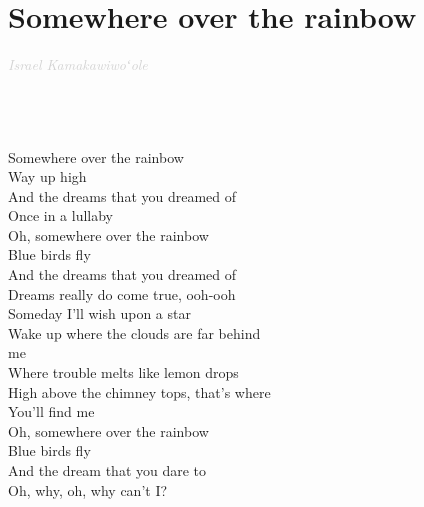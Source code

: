 \documentclass[a5paper, 10pt]{book}
\begin{document}
\newpage
\section{Somewhere over the rainbow}\textcolor{lightgray}{\textit{Israel Kamakawiwoʻole}}\\~\\
\begin{minipage}[t]{0.7\textwidth}
~\\~\\
Somewhere over the rainbow\\
Way up high\\
And the dreams that you dreamed of\\
Once in a lullaby\\

Oh, somewhere over the rainbow\\
Blue birds fly\\
And the dreams that you dreamed of\\
Dreams really do come true, ooh-ooh\\

\hspace*{5mm}Someday I'll wish upon a star\\
\hspace*{5mm}Wake up where the clouds are far behind \\
\hspace*{5mm}me\\
\hspace*{5mm}Where trouble melts like lemon drops\\
\hspace*{5mm}High above the chimney tops, that's where\\
\hspace*{5mm}You'll find me\\

Oh, somewhere over the rainbow\\
Blue birds fly\\
And the dream that you dare to\\
Oh, why, oh, why can't I?\\
\end{minipage}
\end{document}
